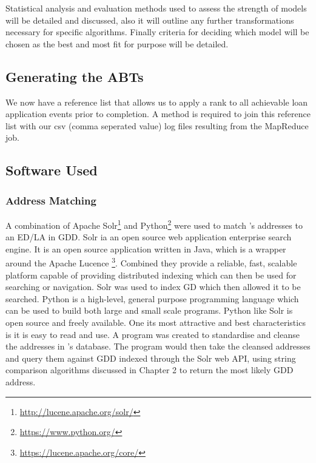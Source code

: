 Statistical analysis and evaluation methods used to assess the strength of models will be detailed and discussed, also it will outline any further transformations necessary for specific algorithms. Finally criteria for deciding which model will be chosen as the best and most fit for purpose will be detailed.


\subsection{Generating the ABTs}
We now have a reference list that allows us to apply a rank to all achievable loan application events prior to completion. A method is required to join this reference list with our csv (comma seperated value) log files resulting from the MapReduce job. 

\subsection{Software Used}\label{softwareUsed}

\subsubsection{Address Matching}
A combination of Apache Solr\footnote{\url{http://lucene.apache.org/solr/}} and Python\footnote{\url{https://www.python.org/}} were used to match \subjectname's addresses to an ED/LA in GDD. Solr ia an open source web application enterprise search engine. It is an open source application written in Java, which is a wrapper around the Apache Lucence \footnote{{\url{https://lucene.apache.org/core/}}}. Combined they provide a reliable, fast, scalable platform capable of providing distributed indexing which can then be used for searching or navigation. Solr was used to index GD which then allowed it to be searched. Python is a high-level, general purpose programming language which can be used to build both large and small scale programs. Python like Solr is open source and freely available. One its most attractive and best characteristics is it is easy to read and use. A program was created to standardise and cleanse the addresses in \subjectname's database. The program would then take the cleansed addresses and query them against GDD indexed through the Solr web API, using string comparison algorithms discussed in Chapter 2 to return the most likely GDD address.

